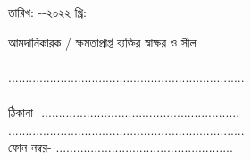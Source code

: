 \documentclass[12pt]{article}
\newcommand{\rodt}{\hspace{3em}-\hspace{3em}-২০২২ খ্রি:}
\begin{document}
\begin{minipage}[t]{0.55\linewidth}
তারিখ: {\rodt}
\end{minipage}
\begin{minipage}[t]{0.45\linewidth}
আমদানিকারক / ক্ষমতাপ্রাপ্ত ব্যক্তির স্বাক্ষর ও সীল
\\
\\
....................................................................
\\
\\
ঠিকানা- .........................................................
\\
....................................................................
\\
ফোন নম্বর-  ...................................................
\end{minipage}
\thispagestyle{laststyle}
\end{document}

